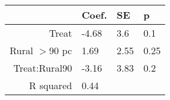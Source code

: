 \begin{tabular}{rlll}
  \hline
 & Coef. & SE & p \\ 
  \hline
Treat & -4.68 & 3.6 & 0.1 \\ 
  Rural $>$90 pc & 1.69 & 2.55 & 0.25 \\ 
  Treat:Rural90 & -3.16 & 3.83 & 0.2 \\ 
  R squared & 0.44 &  &  \\ 
   \hline
\end{tabular}

